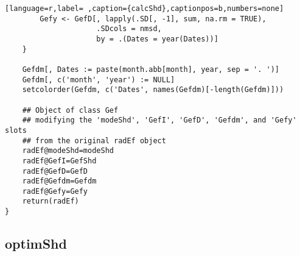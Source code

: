 \begin{lstlisting}[language=r,label= ,caption={calcShd},captionpos=b,numbers=none]
        Gefy <- GefD[, lapply(.SD[, -1], sum, na.rm = TRUE),
                     .SDcols = nmsd,
                     by = .(Dates = year(Dates))]
    }

    Gefdm[, Dates := paste(month.abb[month], year, sep = '. ')]
    Gefdm[, c('month', 'year') := NULL]
    setcolorder(Gefdm, c('Dates', names(Gefdm)[-length(Gefdm)]))

    ## Object of class Gef
    ## modifying the 'modeShd', 'GefI', 'GefD', 'Gefdm', and 'Gefy' slots
    ## from the original radEf object
    radEf@modeShd=modeShd
    radEf@GefI=GefShd
    radEf@GefD=GefD
    radEf@Gefdm=Gefdm
    radEf@Gefy=Gefy
    return(radEf)
}
\end{lstlisting}
\subsection{optimShd}
\label{sec:org92c073f}
\label{subsec:optimShd}
